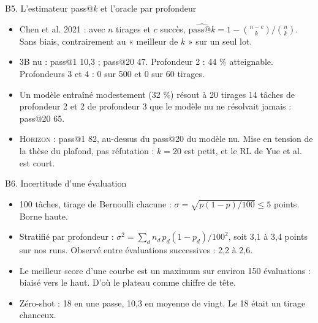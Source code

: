 \documentclass[aspectratio=169,10pt]{beamer}
\begin{document}
\begin{frame}{B5. L'estimateur pass@$k$ et l'oracle par profondeur}
\begin{itemize}
  \item Chen et al. 2021 : avec $n$ tirages et $c$ succès, $\widehat{\text{pass@}k} = 1 - \binom{n-c}{k}\big/\binom{n}{k}$. Sans biais, contrairement au « meilleur de $k$ » sur un seul lot.
  \item 3B nu : pass@1 10,3 ; pass@20 47. Profondeur 2 : 44 \% atteignable. Profondeurs 3 et 4 : 0 sur 500 et 0 sur 60 tirages.
  \item Un modèle entraîné modestement (32 \%) résout à 20 tirages 14 tâches de profondeur 2 et 2 de profondeur 3 que le modèle nu ne résolvait jamais : pass@20 65.
  \item \textsc{Horizon} : pass@1 82, au-dessus du pass@20 du modèle nu. Mise en tension de la thèse du plafond, pas réfutation : $k=20$ est petit, et le RL de Yue et al. est court.
\end{itemize}
\end{frame}

\begin{frame}{B6. Incertitude d'une évaluation}
\begin{itemize}
  \item 100 tâches, tirage de Bernoulli chacune : $\sigma = \sqrt{p(1-p)/100} \le 5$ points. Borne haute.
  \item Stratifié par profondeur : $\sigma^2 = \sum_d n_d\, p_d(1-p_d)/100^2$, soit 3,1 à 3,4 points sur nos runs. Observé entre évaluations successives : 2,2 à 2,6.
  \item Le meilleur score d'une courbe est un maximum sur environ 150 évaluations : biaisé vers le haut. D'où le plateau comme chiffre de tête.
  \item Zéro-shot : 18 en une passe, 10,3 en moyenne de vingt. Le 18 était un tirage chanceux.
\end{itemize}
\end{frame}
\end{document}
